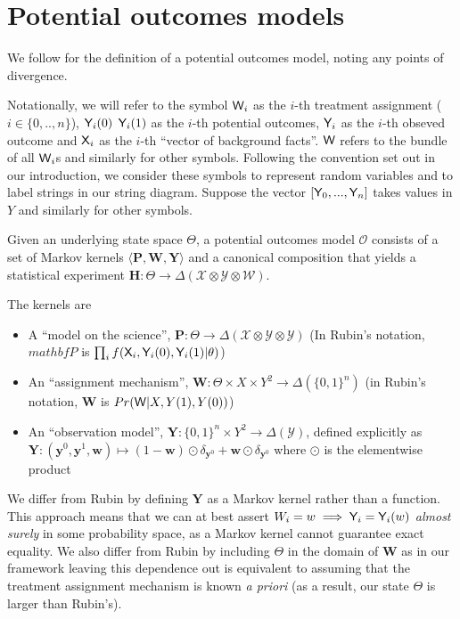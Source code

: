 
\section{Potential outcomes models}\label{sec:counterfactuals}

We follow \cite{rubin_causal_2005} for the definition of a potential outcomes model, noting any points of divergence. 

Notationally, we will refer to the symbol $\mathsf{W}_i$ as the $i$-th treatment assignment ($i\in \{0,..,n\}$), $\mathsf{Y}_i(0)$ $\mathsf{Y}_i(1)$ as the $i$-th potential outcomes, $\mathsf{Y}_i$ as the $i$-th obseved outcome and $\mathsf{X}_i$ as the $i$-th ``vector of background facts''. $\mathsf{W}$ refers to the bundle of all $\mathsf{W}_i$s and similarly for other symbols. Following the convention set out in our introduction, we consider these symbols to represent random variables and to label strings in our string diagram. Suppose the vector $[\mathsf{Y}_0,...,\mathsf{Y}_n]$ takes values in $Y$ and similarly for other symbols.

Given an underlying state space $\Theta$, a potential outcomes model $\mathscr{O}$ consists of a set of Markov kernels $\langle \mathbf{P}, \mathbf{W}, \mathbf{Y} \rangle$ and a canonical composition that yields a statistical experiment $\mathbf{H}:\Theta\to \Delta(\mathcal{X}\otimes\mathcal{Y}\otimes \mathcal{W})$. 

The kernels are
\begin{itemize}
\item A ``model on the science'', $\mathbf{P}:\Theta \to \Delta(\mathcal{X}\otimes\mathcal{Y}\otimes\mathcal{Y})$ (In Rubin's notation, $mathbf{P}$ is $\prod_i f(\mathsf{X}_i,\mathsf{Y}_i(0),\mathsf{Y}_i(1)|\theta)$)
\item An ``assignment mechanism'', $\mathbf{W}:\Theta\times X\times Y^2 \to \Delta(\{0,1\}^n)$ (in Rubin's notation, $\mathbf{W}$ is $Pr(\mathsf{W}|X,Y(1),Y(0))$)
\item An ``observation model'', $\mathbf{Y}:\{0,1\}^n\times Y^2\to \Delta(\mathcal{Y})$, defined explicitly as $\mathbf{Y}:(\mathbf{y}^0,\mathbf{y}^1,\mathbf{w})\mapsto (1-\mathbf{w}) \odot \delta_{\mathbf{y}^0} + \mathbf{w} \odot \delta_{\mathbf{y}^0}$ where $\odot$ is the elementwise product
\end{itemize}

We differ from Rubin by defining $\mathbf{Y}$ as a Markov kernel rather than a function. This approach means that we can at best assert $W_i=w\implies \mathsf{Y}_i=\mathsf{Y}_i(w)$ \emph{almost surely} in some probability space, as a Markov kernel cannot guarantee exact equality. We also differ from Rubin by including $\Theta$ in the domain of $\mathbf{W}$ as in our framework leaving this dependence out is equivalent to assuming that the treatment assignment mechanism is known \emph{a priori} (as a result, our state $\Theta$ is larger than Rubin's).

